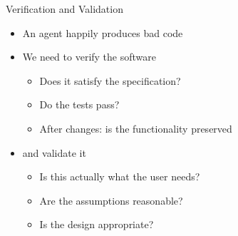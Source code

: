 \documentclass[
ps,
]{prosper}
\begin{document}
\begin{slide}{Verification and Validation}

\begin{itemize}

\item An agent happily produces bad code

\item We need to verify the software
  
  \begin{itemize}
    
  \item Does it satisfy the specification?

  \item Do the tests pass?

  \item After changes: is the functionality preserved
    
  \end{itemize}

\item and validate it
  
  \begin{itemize}
    
  \item Is this actually what the user needs?

  \item Are the assumptions reasonable?

  \item Is the design appropriate?
    
  \end{itemize}
  

\end{itemize}
  
\end{slide}
\end{document}
